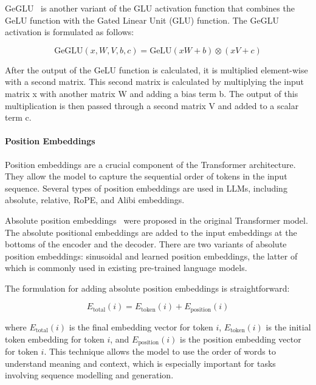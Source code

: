 GeGLU~\cite{shazeer2020glu} is another variant of the GLU activation function that combines the GeLU function with the Gated Linear Unit (GLU) function.
The GeGLU activation is formulated as follows:

\begin{equation}
	\text{GeGLU}\left(x, W, V, b, c\right) = \text{GeLU}\left(xW + b\right) \otimes \left(xV + c\right)
	\label{eq:geglu}
\end{equation}

\noindent After the output of the GeLU function is calculated, it is multiplied element-wise with a second matrix.
This second matrix is calculated by multiplying the input matrix x with another matrix W and adding a bias term b.
The output of this multiplication is then passed through a second matrix V and added to a scalar term c.

\paragraph{Position Embeddings}
\label{subsubsec:position-embeddings}

Position embeddings are a crucial component of the Transformer architecture.
They allow the model to capture the sequential order of tokens in the input sequence.
Several types of position embeddings are used in LLMs, including absolute, relative, RoPE, and Alibi embeddings.

Absolute position embeddings~\cite{vaswani2023attention} were proposed in the original Transformer model.
The absolute positional embeddings are added to the input embeddings at the bottoms of the encoder and the decoder.
There are two variants of absolute position embeddings: sinusoidal and learned position embeddings, the latter of which is commonly used in existing pre-trained language models.

The formulation for adding absolute position embeddings is straightforward:

\begin{equation}
	E_{\text{total}}(i) = E_{\text{token}}(i) + E_{\text{position}}(i)
	\label{eq:absolute-position-embeddings}
\end{equation}

\noindent where \(E_{\text{total}}(i)\) is the final embedding vector for token \(i\), \(E_{\text{token}}(i)\) is the initial token embedding for token \(i\), and \(E_{\text{position}}(i)\) is the position embedding vector for token \(i\).
This technique allows the model to use the order of words to understand meaning and context, which is especially important for tasks involving sequence modelling and generation.


